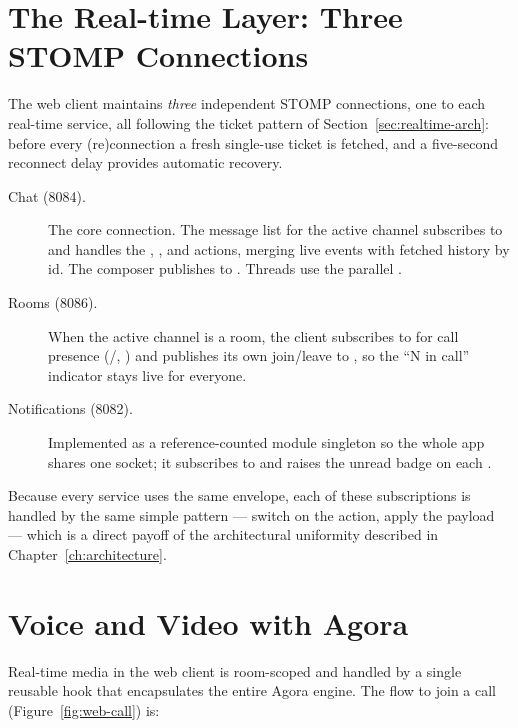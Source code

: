 \section{The Real-time Layer: Three STOMP Connections}

The web client maintains \emph{three} independent STOMP connections, one to each
real-time service, all following the ticket pattern of
Section~\ref{sec:realtime-arch}: before every (re)connection a fresh single-use
ticket is fetched, and a five-second reconnect delay provides automatic recovery.

\begin{description}
  \item[Chat (8084).] The core connection. The message list for the active
  channel subscribes to  and handles the
  , , and  actions,
  merging live events with fetched history by id. The composer publishes to
  . Threads use the parallel .
  \item[Rooms (8086).] When the active channel is a room, the client subscribes
  to  for call presence
  (/, ) and publishes its
  own join/leave to , so the ``N in call'' indicator stays
  live for everyone.
  \item[Notifications (8082).] Implemented as a reference-counted module
  singleton so the whole app shares one socket; it subscribes to
   and raises the unread badge on each
  .
\end{description}

Because every service uses the same  envelope, each of
these subscriptions is handled by the same simple pattern --- switch on the
action, apply the payload --- which is a direct payoff of the architectural
uniformity described in Chapter~\ref{ch:architecture}.

\section{Voice and Video with Agora}

Real-time media in the web client is room-scoped and handled by a single reusable
hook that encapsulates the entire Agora engine. The flow to join a call
(Figure~\ref{fig:web-call}) is:

